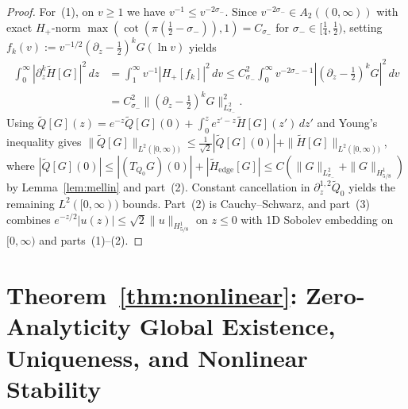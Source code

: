 \documentclass[11pt,a4paper]{article}
\begin{document}
\begin{proof}
For~(1), on $v \ge 1$ we have $v^{-1} \le v^{-2\sigma_-}$. Since $v^{-2\sigma_-} \in A_2((0,\infty))$ with exact $H_+$-norm $\max(\cot(\pi(\frac{1}{2}-\sigma_-)), 1) = C_{\sigma_-}$ for $\sigma_- \in [\frac{1}{4},\frac{1}{2})$, setting $f_k(v) := v^{-1/2}(\partial_z-\frac{1}{2})^k G(\ln v)$ yields
\begin{align*}
\int_0^\infty |\partial_z^k\widetilde{H}[G]|^2\,dz
&= \int_1^\infty v^{-1}|H_+[f_k]|^2\,dv
\le C_{\sigma_-}^2\int_0^\infty v^{-2\sigma_--1}|(\partial_z-\tfrac{1}{2})^k G|^2\,dv \\
&= C_{\sigma_-}^2\|(\partial_z-\tfrac{1}{2})^k G\|_{L^2_{\sigma_-}}^2.
\end{align*}
Using $\widetilde{Q}[G](z) = e^{-z}\widetilde{Q}[G](0) + \int_0^z e^{z'-z}\widetilde{H}[G](z')\,dz'$ and Young's inequality gives $\|\widetilde{Q}[G]\|_{L^2([0,\infty))} \le \frac{1}{\sqrt{2}}|\widetilde{Q}[G](0)| + \|\widetilde{H}[G]\|_{L^2([0,\infty))}$, where $|\widetilde{Q}[G](0)| \le |(T_{Q_0}G)(0)| + |\widetilde{H}_{\mathrm{edge}}[G]| \le C(\|G\|_{L^2_{\sigma_-}} + \|G\|_{H^1_{5/8}})$ by Lemma~\ref{lem:mellin} and part~(2). Constant cancellation in $\partial_z^{1,2}\widetilde{Q}_0$ yields the remaining $L^2([0,\infty))$ bounds. Part~(2) is Cauchy--Schwarz, and part~(3) combines $e^{-z/2}|u(z)| \le \sqrt{2}\|u\|_{H^1_{5/8}}$ on $z \le 0$ with 1D Sobolev embedding on $[0,\infty)$ and parts~(1)--(2).
\end{proof}

\section{Theorem~\ref{thm:nonlinear}: Zero-Analyticity Global Existence, Uniqueness, and Nonlinear Stability}\label{sec:nonlinear}
\end{document}
